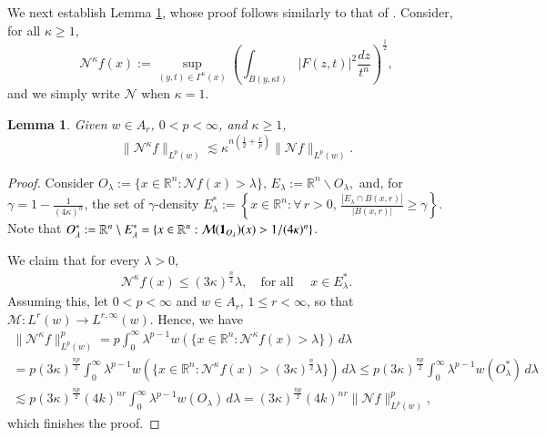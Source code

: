 \documentclass[11pt, a4paper,leqno]{amsart}
\renewcommand{\chi}{{\bf 1}}
\theoremstyle{plain}
\newtheorem{lemma}[equation]{Lemma}
\theoremstyle{definition}
\theoremstyle{remark}
\numberwithin{equation}{section}
\def \R{ \mathbb{R} }
\begin{document}
We next establish Lemma \ref{lema:changeofangelN}, whose
proof follows similarly to that of \cite[Lemma 6.2]{HofmannMayboroda}.
Consider, for all $\kappa\geq 1$,
$$
\mathcal{N}^{\kappa}f(x):=\sup_{(y,t)\in \Gamma^{\kappa}(x)}\left(\int_{B(y,\kappa t)}|F(z,t)|^2\frac{dz}{t^n}\right)^{\frac{1}{2}},
$$
and
we simply write $\mathcal{N}$ when $\kappa=1$. 
\begin{lemma}\label{lema:changeofangelN}
Given $w\in A_{r}$, $0<p<\infty$, and $\kappa\geq 1$, 
$$
\|\mathcal{N}^{\kappa}f\|_{L^p(w)}\lesssim \kappa^{n\left(\frac{1}{2}+\frac{r}{p}\right)} \|\mathcal{N}f\|_{L^p(w)}.
$$
\end{lemma}
\begin{proof}
Consider
$
O_{\lambda}:=\{x\in \R^n: \mathcal{N}f(x)>\lambda\},\, E_{\lambda}:=\R^n\backslash O_{\lambda},
$ and, for $\gamma=1-\frac{1}{(4\kappa)^n}$, the set of $\gamma$-density $E_{\lambda}^*:=
\left\{x\in \R^n: \forall\, r>0,\,\frac{|E_{\lambda}\cap B(x,r)|}{|B(x,r)|}\geq\gamma\right\}$. Note that $O_{\lambda}^*:=\R^n\setminus E_{\lambda}^*=\{x\in \R^n:\mathcal{M}(\chi_{O_{\lambda}})(x)>1/(4\kappa)^n\}$.


We claim that
for every $\lambda>0$,
\begin{align}\label{claim:changeofanglesN}
\mathcal{N}^{\kappa}f(x)\leq (3\kappa)^{\frac{n}{2}}\lambda, \quad \textrm{for all }\quad x\in E^{*}_{\lambda}.
\end{align}
Assuming this, let $0<p<\infty$ and $w\in A_{r}$, $1\leq r<\infty$, so that $\mathcal{M}:L^{r}(w)\rightarrow L^{r,\infty}(w)$. Hence, we  have
\begin{multline*}
\|\mathcal{N}^{\kappa}f\|^p_{L^p(w)}=p\int_{0}^{\infty}\lambda^{p-1}w(\{x\in \R^n:\mathcal{N}^{\kappa}f(x)>\lambda\})\,d\lambda
\\
=
p(3\kappa)^{\frac{np}{2}}\int_{0}^{\infty}\lambda^{p-1}w(\{x\in \R^n:\mathcal{N}^{\kappa}f(x)>(3\kappa)^{\frac{n}{2}}\lambda\})\,d\lambda
\leq
p(3\kappa)^{\frac{np}{2}}\int_{0}^{\infty}\lambda^{p-1}w(O_\lambda^*)\,d\lambda
\\
\lesssim
p(3\kappa)^{\frac{np}{2}}(4k)^{nr}\int_{0}^{\infty}\lambda^{p-1}w(O_\lambda)\,d\lambda=
(3\kappa)^{\frac{np}{2}}
(4k)^{nr}\|\mathcal{N}f\|_{L^p(w)}^p,
\end{multline*}
which  finishes the proof. 



\end{proof}
\end{document}
